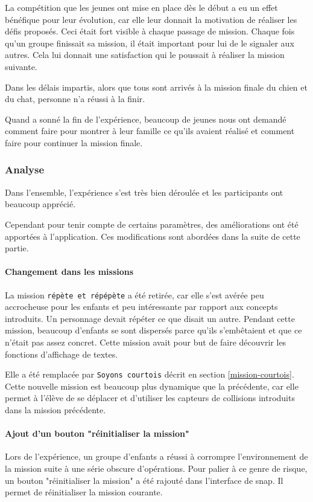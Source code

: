 La compétition que les jeunes ont mise en place dès le début a eu un effet bénéfique pour leur évolution, car elle leur donnait la motivation de réaliser les défis proposés. Ceci était fort visible à chaque passage de \gls{mission}. Chaque fois qu'un groupe finissait sa \gls{mission}, il était important pour lui de le signaler aux autres. Cela lui donnait une satisfaction qui le poussait à réaliser la \gls{mission} suivante.

Dans les délais impartis, alors que tous sont arrivés à la \gls{mission} finale du chien et du chat, personne n'a réussi à la finir.

Quand a sonné la fin de l'expérience, beaucoup de jeunes nous ont demandé comment faire pour montrer à leur famille ce qu'ils avaient réalisé et comment faire pour continuer la \gls{mission} finale.

\subsubsection{Analyse}
\label{analyse-kidscode}
Dans l'ensemble, l'expérience s'est très bien déroulée et les participants ont beaucoup apprécié.

Cependant pour tenir compte de certains paramètres, des améliorations ont été apportées à l'application. Ces modifications sont abordées dans la suite de cette partie.

\paragraph{Changement dans les missions}
La \gls{mission} \texttt{répète et répépète} a été retirée, car elle s'est avérée peu accrocheuse pour les enfants et peu intéressante par rapport aux concepts introduits. Un personnage devait répéter ce que disait un autre. Pendant cette \gls{mission}, beaucoup d'enfants se sont dispersés parce qu'ils s'embêtaient et que ce n'était pas assez concret. Cette \gls{mission} avait pour but de faire découvrir les fonctions d'affichage de textes.

Elle a été remplacée par \texttt{Soyons courtois} décrit en section \ref{mission-courtois}. Cette nouvelle \gls{mission} est beaucoup plus dynamique que la précédente, car elle permet à l'élève de se déplacer et d'utiliser les capteurs de collisions introduits dans la \gls{mission} précédente.

\paragraph{Ajout d'un bouton "réinitialiser la mission"}
Lors de l'expérience, un groupe d'enfants a réussi à corrompre l'environnement de la \gls{mission} suite à une série obscure d'opérations. Pour palier à ce genre de risque, un bouton "réinitialiser la mission" a été rajouté dans l'interface de \gls{snap}. Il permet de réinitialiser la \gls{mission} courante.

